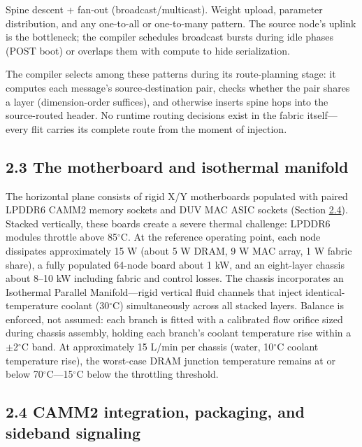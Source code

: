 \documentclass[12pt,onecolumn]{article}
\begin{document}
Spine descent + fan-out (broadcast/multicast). Weight upload, parameter distribution, and any one-to-all or one-to-many pattern. The source node's uplink is the bottleneck; the compiler schedules broadcast bursts during idle phases (POST boot) or overlaps them with compute to hide serialization.

The compiler selects among these patterns during its route-planning stage: it computes each message's source-destination pair, checks whether the pair shares a layer (dimension-order suffices), and otherwise inserts spine hops into the source-routed header. No runtime routing decisions exist in the fabric itself---every flit carries its complete route from the moment of injection.

\subsection*{2.3 The motherboard and isothermal manifold}\label{sec:2.3}

The horizontal plane consists of rigid X/Y motherboards populated with paired LPDDR6 CAMM2 memory sockets and DUV MAC ASIC sockets (Section \hyperref[sec:2.4]{2.4}). Stacked vertically, these boards create a severe thermal challenge: LPDDR6 modules throttle above 85$^\circ$C. At the reference operating point, each node dissipates approximately 15 W (about 5 W DRAM, 9 W MAC array, 1 W fabric share), a fully populated 64-node board about 1 kW, and an eight-layer chassis about 8--10 kW including fabric and control losses. The chassis incorporates an Isothermal Parallel Manifold---rigid vertical fluid channels that inject identical-temperature coolant (30$^\circ$C) simultaneously across all stacked layers. Balance is enforced, not assumed: each branch is fitted with a calibrated flow orifice sized during chassis assembly, holding each branch's coolant temperature rise within a $\pm$2$^\circ$C band. At approximately 15 L/min per chassis (water, 10$^\circ$C coolant temperature rise), the worst-case DRAM junction temperature remains at or below 70$^\circ$C---15$^\circ$C below the throttling threshold.

\subsection*{2.4 CAMM2 integration, packaging, and sideband signaling}\label{sec:2.4}
\end{document}
